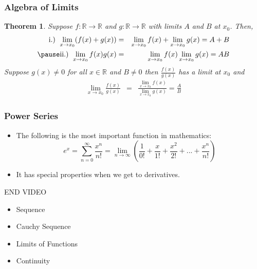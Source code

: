 \documentclass{beamer}
\newtheorem{thm}{Theorem}
\numberwithin{equation}{section}
\begin{document}
\begin{frame}
\frametitle{Algebra of Limits}

\begin{thm}
Suppose $f:\mathbb{R} \rightarrow \mathbb{R}$ and $g: \mathbb{R} \rightarrow\mathbb{R}$ with limits $A$ and $B$ at $x_{0}$.  Then, 
\begin{eqnarray}
\text{i.) } \lim_{x \rightarrow x_{0} } (f(x) + g(x) ) & = & \lim_{x \rightarrow x_{0}} f(x) + \lim_{x \rightarrow x_{0}} g(x)  = A + B\nonumber \\\pause
\text{ii.) }\lim_{x \rightarrow x_{0} } f(x) g(x) & = & \lim_{x \rightarrow x_{0}} f(x) \lim_{x\rightarrow x_{0}} g(x)  = A B\nonumber 
\end{eqnarray}
Suppose $g(x) \neq 0$ for all $x \in \mathbb{R}$ and $B \neq 0$ then $\frac{f(x)}{g(x)}$ has a limit at $x_{0}$ and 
\begin{eqnarray}
\lim_{x \rightarrow x_{0}} \frac{f(x)}{g(x)} & = &  \frac{\lim_{x\rightarrow x_{0} } f(x) }{\lim_{x \rightarrow x_{0} } g(x) } = \frac{A}{B}\nonumber 
\end{eqnarray}
\end{thm}

\end{frame}



\begin{frame}
\frametitle{Power Series}

\begin{itemize}
\item The following is the most important function in mathematics:\pause
$$e^x=\sum_{n=0}^{\infty} \frac{x^n}{n!}=\lim_{n\rightarrow \infty} \left(\frac{1}{0!}+\frac{x}{1!}+\frac{x^2}{2!}+... +\frac{x^n}{n!}\right)$$\pause
\item It has special properties when we get to derivatives.
\end{itemize}

\end{frame}



\begin{frame}
END VIDEO

\end{frame}
\begin{frame}

\begin{itemize}
\item \textcolor{mygray}{Sequence}
\item \textcolor{mygray}{Cauchy Sequence}
\item \textcolor{mygray}{Limits of Functions}
\item \textcolor{myblack}{Continuity}
\end{itemize}

\end{frame}
\end{document}
